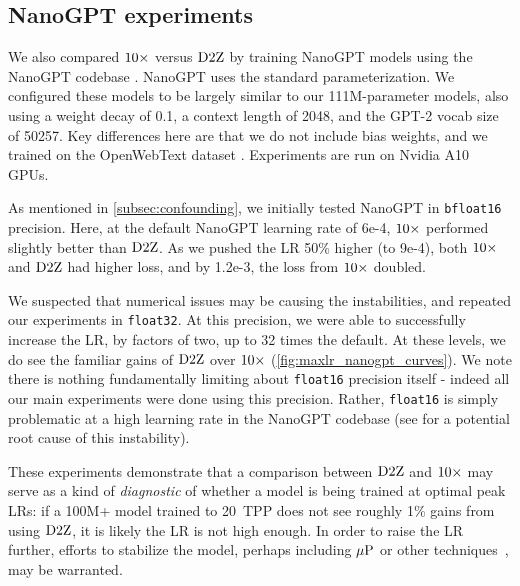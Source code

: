 \subsection{NanoGPT experiments}\label{subsec:nanogpt}


We also compared $\mbox{10}\times$ versus $\mbox{D2Z}$ by training NanoGPT models
using the NanoGPT codebase \citep{karpathy2024nanogpt}.
%
NanoGPT uses the standard parameterization.  We configured these
models to be largely similar to our 111M-parameter models, also using
a weight decay of 0.1, a context length of 2048, and the GPT-2 vocab
size of 50257.  Key differences here are that we do not include bias
weights, and we trained on the OpenWebText dataset
\citep{gokaslan2019owt}.
%
Experiments are run on Nvidia A10 GPUs.

As mentioned in \cref{subsec:confounding}, we initially tested
NanoGPT in \verb|bfloat16| precision.  Here, at the default NanoGPT
learning rate of 6e-4, $\mbox{10}\times$ performed slightly better than $\mbox{D2Z}$.
As we pushed the LR 50\% higher (to 9e-4), both $\mbox{10}\times$ and $\mbox{D2Z}$
had higher loss, and by 1.2e-3, the loss from $\mbox{10}\times$ doubled.



We suspected that numerical issues may be causing the instabilities,
and repeated our experiments in \verb|float32|.  At this precision, we
were able to successfully increase the LR, by factors of two, up to 32
times the default.
%
At these levels, we do see the familiar gains of $\mbox{D2Z}$ over $\mbox{10}\times$
(\cref{fig:maxlr_nanogpt_curves}).
%
We note there is nothing fundamentally limiting about \verb|float16|
precision itself - indeed all our main experiments were done using
this precision.  Rather, \verb|float16| is simply problematic at a
high learning rate in the NanoGPT codebase (see \citet[Appendix
  C.2]{gray2024normalization} for a potential root cause of this
instability).

These experiments demonstrate that a comparison between $\mbox{D2Z}$ and
$\mbox{10}\times$ may serve as a kind of \emph{diagnostic} of whether a model is
being trained at optimal peak LRs: if a 100M+ model trained to 20~TPP
does not see roughly 1\% gains from using $\mbox{D2Z}$, it is likely the LR
is not high enough.  In order to raise the LR further, efforts to
stabilize the model, perhaps including $\mbox{$\mu$P}$ or other
techniques~\citep{wortsman2023small}, may be warranted.

